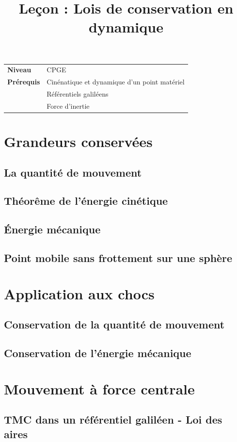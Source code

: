 \documentclass[10pt]{beamer}
\title{Leçon : Lois de conservation en dynamique}
\begin{document}
\begin{frame}{}
    \titlepage

    \begin{tabularx}{\textwidth}{l@{:\,\,}X}
        \textbf{Niveau} 	  & CPGE\\
        \textbf{Prérequis} & Cinénatique et dynamique d'un point matériel\\
        &			Référentiels galiléens\\
        & 			Force d'inertie
    \end{tabularx}
\end{frame}

\section{Grandeurs conservées}
\subsection{La quantité de mouvement}
\subsection{Théorême de l'énergie cinétique}
\subsection{Énergie mécanique}
\subsection{Point mobile sans frottement sur une sphère}
\section{Application aux chocs}
\subsection{Conservation de la quantité de mouvement}
\subsection{Conservation de l'énergie mécanique}
\section{Mouvement à force centrale}
\subsection{TMC dans un référentiel galiléen - Loi des aires}
\end{document}
